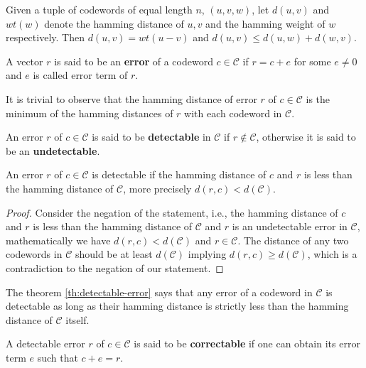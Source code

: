 \begin{lemma}\cite{gallian2024contemporary}\label{lem:distance}
  Given a tuple of codewords of equal length $n$, $(u, v, w)$, let $d(u,v)$ and $wt(w)$ denote the hamming 
  distance of $u, v$ and the hamming weight of $w$ respectively. Then $d(u,v) = wt(u-v)$ and 
  $d(u,v)\leq d(u,w)+d(w,v)$.
\end{lemma}

\begin{definition}[error]
  A vector $r$ is said to be an \textbf{error} of a codeword $c\in\mathcal{C}$ if 
  $r=c+e$ for some $e\neq 0$ and $e$ is called error term of $r$.
\end{definition}

It is trivial to observe that the hamming distance of error $r$ of $c\in\mathcal{C}$ is the minimum of the 
hamming distances of $r$ with each codeword in $\mathcal{C}$.

\begin{definition}
  An error $r$ of $c\in\mathcal{C}$ is said to be \textbf{detectable} in $\mathcal{C}$ if 
  $r\notin\mathcal{C}$, otherwise it is said to be an \textbf{undetectable}.
\end{definition}

\begin{theorem}\cite{gallian2024contemporary}\label{th:detectable-error}
  An error $r$ of $c\in\mathcal{C}$ is detectable if the hamming distance of $c$ 
  and $r$ is less than the hamming distance of $\mathcal{C}$, more precisely 
  $d(r,c)<d(\mathcal{C})$.
\end{theorem}
\begin{proof}
  Consider the negation of the statement, i.e., the hamming distance of $c$ and $r$ is less than 
  the hamming distance of $\mathcal{C}$ and $r$ is an undetectable error in $\mathcal{C}$, mathematically 
  we have $d(r,c)<d(\mathcal{C})$ and $r\in\mathcal{C}$. The distance of any two codewords in 
  $\mathcal{C}$ should be at least $d(\mathcal{C})$ implying $d(r,c)\geq d(\mathcal{C})$, which is a 
  contradiction to the negation of our statement.
\end{proof}

The theorem \ref{th:detectable-error} says that any error of a codeword in $\mathcal{C}$ is 
detectable as long as their hamming distance is strictly less than the hamming distance of
$\mathcal{C}$ itself.

\begin{definition}
  A detectable error $r$ of $c\in\mathcal{C}$ is said to be \textbf{correctable} if one can obtain its 
  error term $e$ such that $c+e=r$.
\end{definition}

